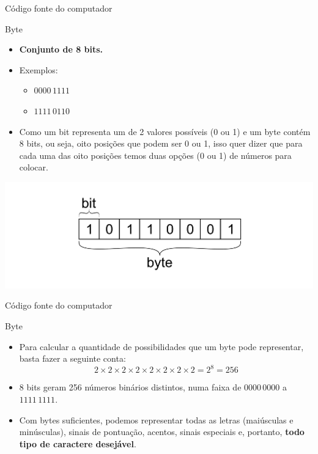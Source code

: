 \begin{frame}{Código fonte do computador}
	\begin{block}{Byte}
		\begin{itemize}
			\item \textbf{Conjunto de 8 bits.}
			\item Exemplos:
			      \begin{itemize}
				      \item\normalsize $ 0000\,1111 $
				      \item\normalsize $ 1111\,0110 $
			      \end{itemize}
			\item Como um bit representa um de 2 valores possíveis (0 ou 1) e um byte contém 8 bits, ou seja, oito posições que podem ser 0 ou 1, isso quer dizer que para cada uma das oito posições temos duas opções (0 ou 1) de números para colocar.
		\end{itemize}
	\end{block}

	\centering
	\includegraphics[width=0.7\linewidth]{Figuras/Ch02/fig3}
\end{frame}


\begin{frame}{Código fonte do computador}
	\begin{block}{Byte}
		\begin{itemize}
			\item Para calcular a quantidade de possibilidades que um byte pode representar, basta fazer a seguinte conta:
			      \[ 2 \times2 \times2 \times2 \times2 \times2 \times2 \times2 = 2^{8} = 256 \]
			\item 8 bits geram 256 números binários distintos, numa faixa de $ 0000\,0000 $ a $ 1111\,1111 $.
			\item Com bytes suficientes, podemos representar todas as letras (maiúsculas e minúsculas), sinais de pontuação, acentos, sinais especiais e, portanto, \textbf{todo tipo de caractere desejável}.
		\end{itemize}
	\end{block}

\end{frame}


